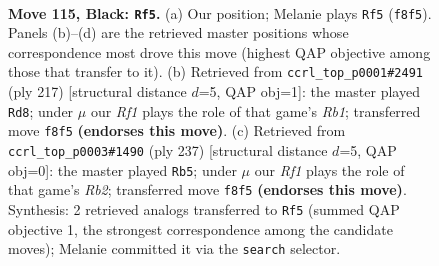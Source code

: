 \documentclass[11pt]{article}
\begin{document}
\begin{figure}[p]\centering
\begin{subfigure}{0.46\textwidth}\centering
\resizebox{\linewidth}{!}{%
\newchessgame
\chessboard[
  setfen={5r2/6K1/8/8/6k1/8/8/8 b - - 15 115},
  showmover=false,
  pgfstyle=straightmove, color=movearrow, markmove={f8-f5}
]}
\caption{}
\end{subfigure}\hfill
\begin{subfigure}{0.46\textwidth}\centering
\resizebox{\linewidth}{!}{%
\newchessgame
\chessboard[
  setfen={1r6/4k3/8/8/K7/8/3N4/8 b - - 13 109},
  showmover=false,
  pgfstyle=straightmove, color=movearrow, markmove={b8-d8}
]}
\caption{}
\end{subfigure}
\\[4pt]
\begin{subfigure}{0.46\textwidth}\centering
\resizebox{\linewidth}{!}{%
\newchessgame
\chessboard[
  setfen={8/1r6/3K4/8/k7/8/4Q3/8 b - - 14 119},
  showmover=false,
  pgfstyle=straightmove, color=movearrow, markmove={b7-b5}
]}
\caption{}
\end{subfigure}\hfill

\caption{\textbf{Move 115, Black: \texttt{Rf5}.} (a) Our position; Melanie plays \texttt{Rf5} (\texttt{f8f5}). Panels (b)--(d) are the retrieved master positions whose correspondence most drove this move (highest QAP objective among those that transfer to it). (b) Retrieved from \texttt{ccrl\_top\_p0001\#2491} (ply 217) [structural distance $d$=5, QAP obj=1]: the master played \texttt{Rd8}; under $\mu$ our \emph{Rf1} plays the role of that game's \emph{Rb1}; transferred move \texttt{f8f5} \textbf{(endorses this move)}. (c) Retrieved from \texttt{ccrl\_top\_p0003\#1490} (ply 237) [structural distance $d$=5, QAP obj=0]: the master played \texttt{Rb5}; under $\mu$ our \emph{Rf1} plays the role of that game's \emph{Rb2}; transferred move \texttt{f8f5} \textbf{(endorses this move)}. Synthesis: 2 retrieved analogs transferred to \texttt{Rf5} (summed QAP objective 1, the strongest correspondence among the candidate moves); Melanie committed it via the \texttt{search} selector.}
\label{fig:thought-m229}
\end{figure}

\clearpage
\end{document}

